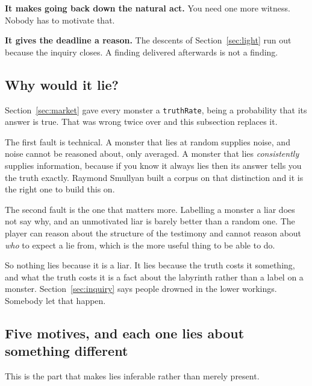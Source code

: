 \documentclass[11pt,a4paper]{article}
\begin{document}
\textbf{It makes going back down the natural act.} You need one more witness. Nobody has to
motivate that.

\textbf{It gives the deadline a reason.} The descents of Section~\ref{sec:light} run out because
the inquiry closes. A finding delivered afterwards is not a finding.

\subsection{Why would it lie?}
\label{sec:kinds}

Section~\ref{sec:market} gave every monster a \texttt{truthRate}, being a probability that its
answer is true. That was wrong twice over and this subsection replaces it.

The first fault is technical. A monster that lies at random supplies noise, and noise cannot be
reasoned about, only averaged. A monster that lies \emph{consistently} supplies information,
because if you know it always lies then its answer tells you the truth exactly. Raymond Smullyan
built a corpus on that distinction and it is the right one to build this on.

The second fault is the one that matters more. Labelling a monster a liar does not say why, and an
unmotivated liar is barely better than a random one. The player can reason about the structure of
the testimony and cannot reason about \emph{who} to expect a lie from, which is the more useful
thing to be able to do.

\begin{sectionbox}
So nothing lies because it is a liar. It lies because the truth costs it something, and what the
truth costs it is a fact about the labyrinth rather than a label on a monster.
Section~\ref{sec:inquiry} says people drowned in the lower workings. Somebody let that happen.
\end{sectionbox}

\subsection{Five motives, and each one lies about something different}

This is the part that makes lies inferable rather than merely present.
\end{document}
